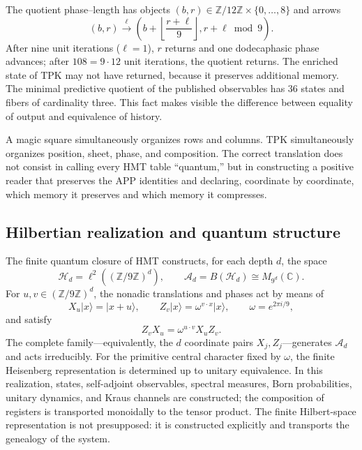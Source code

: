 The quotient phase--length has objects $(b,r)\in\mathbb Z/12\mathbb Z
\times\{0,\ldots,8\}$ and arrows
\[
 (b,r)\xrightarrow{\ell}
 \left(b+\left\lfloor\frac{r+\ell}{9}\right\rfloor,
       r+\ell\bmod9\right).
 \tag{GMC-2.11}
\]
After nine unit iterations ($\ell=1$), $r$ returns and one
dodecaphasic phase advances; after $108=9\cdot12$ unit iterations, the quotient returns.
The enriched state of TPK may not
have returned, because it preserves additional memory. The minimal predictive
quotient of the published observables has 36 states and fibers of cardinality
three. This fact makes visible the difference between equality of output and
equivalence of history.

\begin{intuitionbox}
A magic square simultaneously organizes rows and columns. TPK simultaneously organizes position, sheet, phase, and composition. The correct translation does not consist in calling every HMT table “quantum,” but in constructing a positive reader that preserves the APP identities and declaring, coordinate by coordinate, which memory it preserves and which memory it compresses.
\end{intuitionbox}

\subsection{Hilbertian realization and quantum structure}

The finite quantum closure of HMT constructs, for each depth
$d$, the space
\[
 \mathcal H_d=\ell^2((\mathbb Z/9\mathbb Z)^d),
 \qquad
 \mathcal A_d=B(\mathcal H_d)\cong M_{9^d}(\mathbb C).
 \tag{GMC-2.12}
\]
For $u,v\in(\mathbb Z/9\mathbb Z)^d$, the nonadic translations and phases
act by means of
\[
 X_u|x\rangle=|x+u\rangle,
 \qquad
 Z_v|x\rangle=\omega^{v\cdot x}|x\rangle,
 \qquad \omega=e^{2\pi i/9},
\]
and satisfy
\[
 Z_vX_u=\omega^{u\cdot v}X_uZ_v.
\]
The complete family---equivalently, the $d$ coordinate pairs
$X_j,Z_j$---generates $\mathcal A_d$ and acts irreducibly. For the primitive
central character fixed by $\omega$, the finite Heisenberg representation
is determined up to unitary equivalence. In this realization, states,
self-adjoint observables, spectral measures, Born probabilities, unitary
dynamics, and Kraus channels are constructed; the composition of registers
is transported monoidally to the tensor product. The finite Hilbert-space
representation is not presupposed: it is constructed explicitly and transports
the genealogy of the system.

